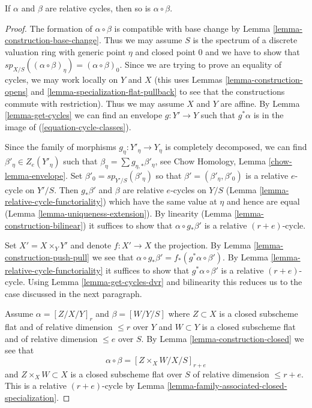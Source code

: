 \begin{lemma}
\label{lemma-well-defined}
If $\alpha$ and $\beta$ are relative cycles, then so is $\alpha \circ \beta$.
\end{lemma}

\begin{proof}
The formation of $\alpha \circ \beta$ is compatible with base change
by Lemma \ref{lemma-construction-base-change}. Thus we may assume
$S$ is the spectrum of a discrete valuation ring with generic point
$\eta$ and closed point $0$ and we have to show that
$sp_{X/S}((\alpha \circ \beta)_\eta) = (\alpha \circ \beta)_0$.
Since we are trying to prove an equality of cycles, we may
work locally on $Y$ and $X$ (this uses
Lemmas \ref{lemma-construction-opens} and
\ref{lemma-specialization-flat-pullback}
to see that the constructions commute with restriction).
Thus we may assume $X$ and $Y$ are affine.
By Lemma \ref{lemma-get-cycles}
we can find an envelope
$g : Y' \to Y$ such that $g^*\alpha$ is in the image of
(\ref{equation-cycle-classes}).

\medskip\noindent
Since the family of morphisms $g_\eta : Y'_\eta \to Y_\eta$
is completely decomposed, we can find $\beta'_\eta \in Z_e(Y'_\eta)$ such that
$\beta_\eta = \sum g_{\eta, *}\beta'_\eta$, see
Chow Homology, Lemma \ref{chow-lemma-envelope}.
Set $\beta'_0 = sp_{Y'/S}(\beta'_\eta)$ so that
$\beta' = (\beta'_\eta, \beta'_0)$ is a relative $e$-cycle on $Y'/S$. Then
$g_*\beta'$ and $\beta$ are relative $e$-cycles
on $Y/S$ (Lemma \ref{lemma-relative-cycle-functoriality})
which have the same value at $\eta$ and hence are equal
(Lemma \ref{lemma-uniqueness-extension}). By linearity
(Lemma \ref{lemma-construction-bilinear})
it suffices to show that $\alpha \circ g_*\beta'$
is a relative $(r + e)$-cycle.

\medskip\noindent
Set $X' = X \times_Y Y'$ and denote $f : X' \to X$ the projection.
By Lemma \ref{lemma-construction-push-pull} we see that
$\alpha \circ g_*\beta' = f_*(g^*\alpha \circ \beta')$.
By Lemma \ref{lemma-relative-cycle-functoriality}
it suffices to show that $g^*\alpha \circ \beta'$
is a relative $(r + e)$-cycle. Using Lemma \ref{lemma-get-cycles-dvr}
and bilinearity this reduces us to the case discussed in the next paragraph.

\medskip\noindent
Assume $\alpha = [Z/X/Y]_r$ and $\beta = [W/Y/S]$
where $Z \subset X$ is a closed subscheme flat and of relative
dimension $\leq r$ over $Y$ and $W \subset Y$ is a closed
subscheme flat and of relative dimension $\leq e$ over $S$.
By Lemma \ref{lemma-construction-closed} we see that
$$
\alpha \circ \beta = [Z \times_X W/X/S]_{r + e}
$$
and $Z \times_X W \subset X$ is a closed subscheme flat over $S$
of relative dimension $\leq r + e$. This is a relative $(r + e)$-cycle by
Lemma \ref{lemma-family-associated-closed-specialization}.
\end{proof}

